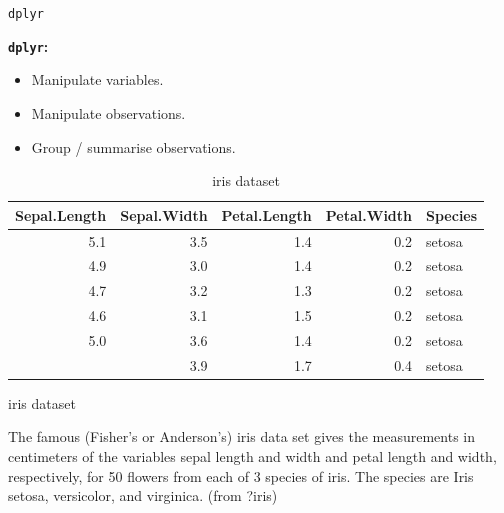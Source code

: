 \documentclass[14pt,ignorenonframetext,]{bredelebeamer}
\providecommand{\tightlist}{%
  \setlength{\itemsep}{0pt}\setlength{\parskip}{0pt}}
\begin{document}
\begin{frame}[fragile]{\texttt{dplyr}}

\textbf{\texttt{dplyr}:}

\begin{itemize}
\tightlist
\item
  Manipulate variables.
\item
  Manipulate observations.
\item
  Group / summarise observations.
\end{itemize}

\begin{table}[t]

\caption{\label{tab:unnamed-chunk-20}iris dataset}
\centering
\begin{tabular}{rrrrl}
\toprule
Sepal.Length & Sepal.Width & Petal.Length & Petal.Width & Species\\
\midrule
\rowcolor{gray!6}  5.1 & 3.5 & 1.4 & 0.2 & setosa\\
4.9 & 3.0 & 1.4 & 0.2 & setosa\\
\rowcolor{gray!6}  4.7 & 3.2 & 1.3 & 0.2 & setosa\\
4.6 & 3.1 & 1.5 & 0.2 & setosa\\
\rowcolor{gray!6}  5.0 & 3.6 & 1.4 & 0.2 & setosa\\
\addlinespace
5.4 & 3.9 & 1.7 & 0.4 & setosa\\
\bottomrule
\end{tabular}
\end{table}

\begin{block}{iris dataset}

The famous (Fisher's or Anderson's) iris data set gives the measurements
in centimeters of the variables sepal length and width and petal length
and width, respectively, for 50 flowers from each of 3 species of iris.
The species are Iris setosa, versicolor, and virginica. (from ?iris)

\end{block}

\end{frame}
\end{document}
